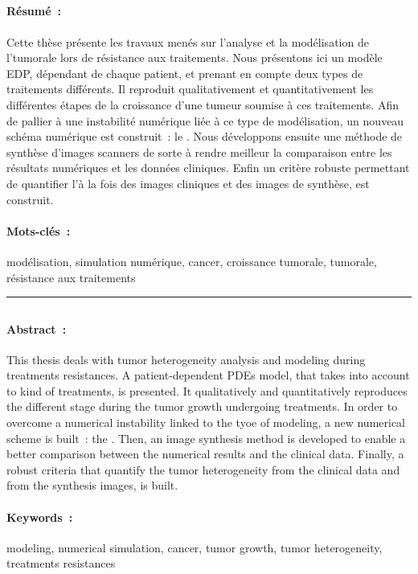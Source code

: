 \documentclass[main.tex]{subfiles}
\begin{document}
\subsection*{\titrefr}
\vfill
\paragraph{Résumé~:} Cette thèse présente les travaux menés sur l'analyse et la modélisation de l'\hetero tumorale lors de résistance aux traitements. 
Nous présentons ici un modèle EDP, dépendant de chaque patient, et prenant en compte deux types de traitements différents. Il reproduit qualitativement et quantitativement les différentes étapes de la croissance d'une tumeur soumise à ces traitements. Afin de pallier à une instabilité numérique liée à ce type de modélisation, un nouveau schéma numérique est construit~: le \twinweno. 
Nous développons ensuite une méthode de synthèse d'images scanners de sorte à rendre meilleur la comparaison entre les résultats numériques et les données cliniques.  
Enfin un critère robuste permettant de quantifier l'\hetero à la fois des images cliniques et des images de synthèse, est construit. 

\paragraph{Mots-clés~:} modélisation, simulation numérique, cancer, croissance tumorale, \hetero tumorale, résistance aux traitements

\vfill
\hrule
\vfill

\subsection*{\titreen}
\vfill
\paragraph{Abstract~:} This thesis deals with tumor heterogeneity analysis and modeling during treatments resistances. 
A patient-dependent PDEs model, that takes into account to kind of treatments, is presented. It qualitatively and quantitatively reproduces the different stage during the tumor growth undergoing treatments. In order to overcome a numerical instability linked to the tyoe of modeling, a new numerical scheme is built~: the \twinweno. 
Then, an image synthesis method is developed to enable a better comparison between the numerical results and the clinical data. 
Finally, a robust criteria that quantify the tumor heterogeneity from the clinical data and from the synthesis images, is built. 

\paragraph{Keywords~:} modeling, numerical simulation, cancer, tumor growth, tumor heterogeneity, treatments resistances
\end{document}
